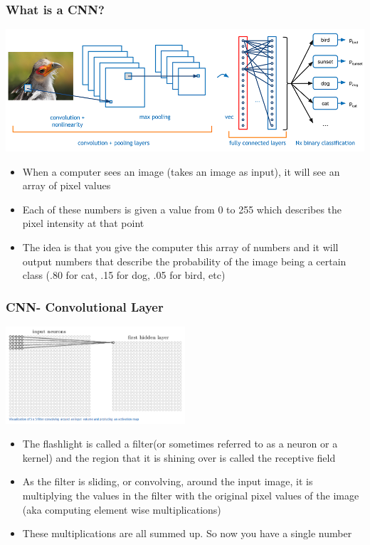 \documentclass{beamer}
\begin{document}
    \begin{frame}
     \frametitle{What is a CNN?}
        \centering
          \includegraphics[width=1.0\textwidth]{images/CNN.png}
           \begin{itemize}
           \item When a computer sees an image (takes an image as input), it will see an array of pixel values
           \item  Each of these numbers is given a value from 0 to 255 which describes the pixel intensity at that point
           \item The idea is that you give the computer this array of numbers and it will output numbers that describe the probability of the image being a certain class (.80 for cat, .15 for dog, .05 for bird, etc)
       \end{itemize}
      
    \end{frame}
    
    \begin{frame}
       \frametitle{CNN- Convolutional Layer}
        \centering
          \includegraphics[width=0.5\textwidth]{images/convlayer.png}
        
          \begin{itemize}
           \item  The flashlight is called a filter(or sometimes referred to as a neuron or a kernel) and the region that it is shining over is called the receptive field
           \item As the filter is sliding, or convolving, around the input image, it is multiplying the values in the filter with the original pixel values of the image (aka computing element wise multiplications)
           \item These multiplications are all summed up. So now you have a single number
           \end{itemize}
    \end{frame}
    
\end{document}
